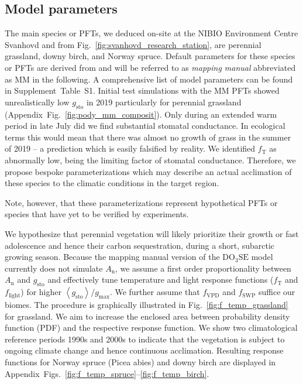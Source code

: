 \documentclass[bg, manuscript]{copernicus}
\begin{document}
\subsection{Model parameters}
\label{subsec:do3se_parameters}

The main species or PFTs, we deduced on-site at the NIBIO Environment Centre Svanhovd and from Fig.~\ref{fig:svanhovd_research_station}, are perennial grassland, downy birch, and Norway spruce. Default parameters for these species or PFTs are derived from \citet{EP:Simpson2007,GCB:Mills2011,ICP:MappingManual2017} and will be referred to as \emph{mapping manual} abbreviated as MM in the following. A comprehensive list of model parameters can be found in Supplement~Table~S1.
Initial test simulations with the MM PFTs showed unrealistically low $g_\mathrm{sto}$ in 2019 particularly for perennial grassland (Appendix~Fig.~\ref{fig:pody_mm_composit}). Only during an extended warm period in late July did we find substantial stomatal conductance. In ecological terms this would mean that there was almost no growth of grass in the summer of 2019 -- a prediction which is easily falsified by reality. We identified $f_\mathrm{T}$ as abnormally low, being the limiting factor of stomatal conductance. Therefore, we propose bespoke parameterizations which may describe an actual acclimation of these species to the climatic conditions in the target region.

Note, however, that these parameterizations represent hypothetical PFTs or species that have yet to be verified by experiments. 

We hypothesize that perennial vegetation will likely prioritize their growth or fast adolescence and hence their carbon sequestration, during a short, subarctic growing season. Because the mapping manual version of the $\mathrm{DO_3SE}$ model currently does not simulate $A_\mathrm{n}$, we assume a first order proportionality between $A_\mathrm{n}$ and $g_\mathrm{sto}$ \citep{GCB:Medlyn2011} and effectively tune temperature and light response functions ($f_\mathrm{T}$ and $f_\mathrm{light}$) for higher $\left<g_\mathrm{sto}\right>/g_\mathrm{max}$. We further assume that $f_\mathrm{VPD}$ and $f_\mathrm{SWP}$ suffice our biomes. The procedure is graphically illustrated in Fig.~\ref{fig:f_temp_grassland} for grassland. We aim to increase the enclosed area between probability density function (PDF) and the respective response function. We show two climatological reference periods 1990s and 2000s to indicate that the vegetation is subject to ongoing climate change and hence continuous acclimation. Resulting response functions for Norway spruce (Picea abies) and downy birch are displayed in Appendix~Figs.~\ref{fig:f_temp_spruce}--\ref{fig:f_temp_birch}. 
\end{document}
